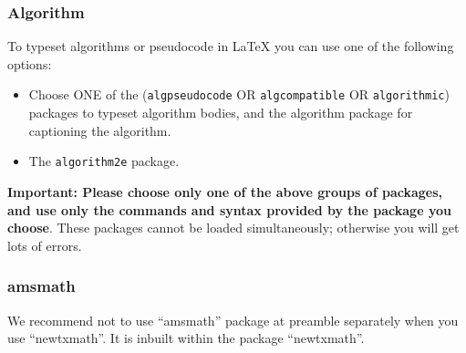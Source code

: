 \documentclass[graybox]{svmult}
\begin{document}
\begin{refguide}
\begin{sloppy}
\subsubsection*{Algorithm}

To typeset algorithms or pseudocode in LaTeX you can use one of the following options: 

\begin{itemize}
\item Choose ONE of the (\texttt{algpseudocode} OR \texttt{algcompatible} OR \texttt{algorithmic}) packages to typeset algorithm bodies, and the algorithm package for captioning the algorithm.

\item The \texttt{algorithm2e} package.
\end{itemize}

\noindent
\textbf{Important: Please choose only one of the above groups of packages, and use only the commands and syntax provided by the package you choose}. These packages cannot be loaded simultaneously; otherwise you will get lots of errors.


\subsubsection*{amsmath} 
We recommend not to use ``amsmath'' package at preamble separately when you use ``newtxmath''. It is inbuilt within the package ``newtxmath''.

\end{sloppy}

\end{refguide}
\end{document}
